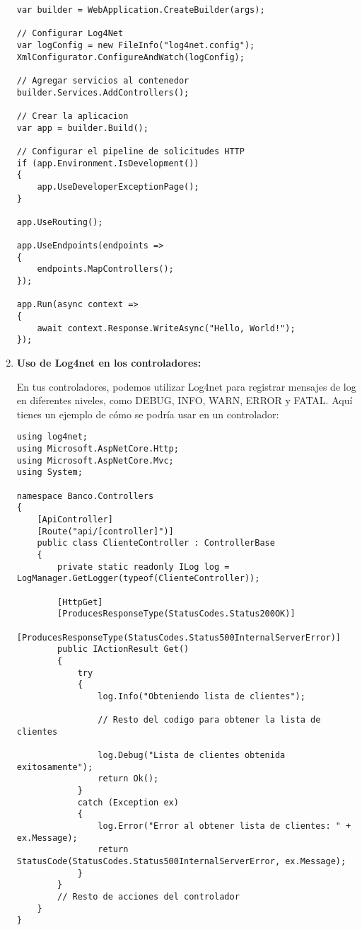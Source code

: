 \documentclass[executivepaper]{article}
\begin{document}
\begin{enumerate}
\begin{lstlisting}
var builder = WebApplication.CreateBuilder(args);

// Configurar Log4Net
var logConfig = new FileInfo("log4net.config");
XmlConfigurator.ConfigureAndWatch(logConfig);

// Agregar servicios al contenedor
builder.Services.AddControllers();

// Crear la aplicacion
var app = builder.Build();

// Configurar el pipeline de solicitudes HTTP
if (app.Environment.IsDevelopment())
{
    app.UseDeveloperExceptionPage();
}

app.UseRouting();

app.UseEndpoints(endpoints =>
{
    endpoints.MapControllers();
});

app.Run(async context =>
{
    await context.Response.WriteAsync("Hello, World!");
});    
\end{lstlisting}
  
  \item \textbf{Uso de Log4net en los controladores:}
  
  En tus controladores, podemos utilizar Log4net para registrar mensajes de log en diferentes niveles, como DEBUG, INFO, WARN, ERROR y FATAL. Aquí tienes un ejemplo de cómo se podría usar en un controlador:
  
\begin{lstlisting}
using log4net;
using Microsoft.AspNetCore.Http;
using Microsoft.AspNetCore.Mvc;
using System;

namespace Banco.Controllers
{
    [ApiController]
    [Route("api/[controller]")]
    public class ClienteController : ControllerBase
    {
        private static readonly ILog log = LogManager.GetLogger(typeof(ClienteController));

        [HttpGet]
        [ProducesResponseType(StatusCodes.Status200OK)]
        [ProducesResponseType(StatusCodes.Status500InternalServerError)]
        public IActionResult Get()
        {
            try
            {
                log.Info("Obteniendo lista de clientes");

                // Resto del codigo para obtener la lista de clientes

                log.Debug("Lista de clientes obtenida exitosamente");
                return Ok();
            }
            catch (Exception ex)
            {
                log.Error("Error al obtener lista de clientes: " + ex.Message);
                return StatusCode(StatusCodes.Status500InternalServerError, ex.Message);
            }
        }
        // Resto de acciones del controlador
    }
}
\end{lstlisting}
\end{enumerate}
\end{document}
